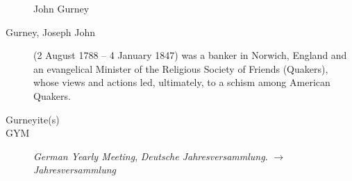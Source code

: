 \begin{description}
John Gurney

\item[Gurney, Joseph John] (2 August 1788 – 4 January 1847) was a banker in Norwich, England and an evangelical Minister of the Religious Society of Friends (Quakers), whose views and actions led, ultimately, to a schism among American Quakers.

\item[Gurneyite(s)]

\item[GYM] \textit{German Yearly Meeting}, \textit{Deutsche Jahresversammlung}. $\to$\textit{Jahresversammlung}
 \end{description}

\normalsize
